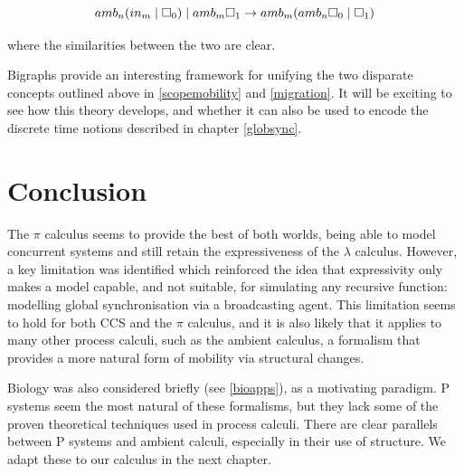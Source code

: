 \begin{equation}
amb_n (in_m \;|\; \square_0) \;|\; amb_m \square_1
\rightarrow
amb_m (amb_n \square_0 \;|\; \square_1)
\end{equation}

\noindent where the similarities between the two are clear.

Bigraphs provide an interesting framework for unifying the two
disparate concepts outlined above in \ref{scopemobility} and
\ref{migration}.  It will be exciting to see how this theory develops,
and whether it can also be used to encode the discrete time notions
described in chapter \ref{globsync}.

\section{Conclusion}

The $\pi$ calculus seems to provide the best of both worlds, being able
to model concurrent systems and still retain the expressiveness of the
$\lambda$ calculus.  However, a key limitation was identified which
reinforced the idea that expressivity only makes a model capable, and
not suitable, for simulating any recursive function: modelling global
synchronisation via a broadcasting agent.  This limitation seems to hold
for both CCS and the $\pi$ calculus, and it is also likely that it
applies to many other process calculi, such as the ambient calculus, a
formalism that provides a more natural form of mobility via structural
changes.

Biology was also considered briefly (see \ref{bioapps}), as a
motivating paradigm.  P systems seem the most natural of these
formalisms, but they lack some of the proven theoretical techniques
used in process calculi.  There are clear parallels between P systems
and ambient calculi, especially in their use of structure.  We adapt
these to our calculus in the next chapter.
